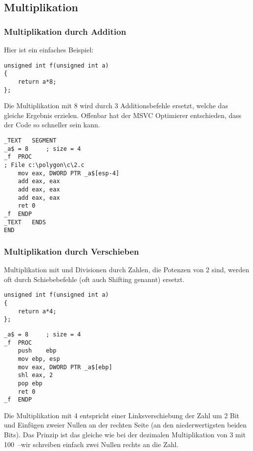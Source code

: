 \subsection{Multiplikation}

\subsubsection{Multiplikation durch Addition}

Hier ist ein einfaches Beispiel:

\begin{lstlisting}[caption=\Optimizing MSVC 2010]
unsigned int f(unsigned int a)
{
	return a*8;
};
\end{lstlisting}

Die Multiplikation mit 8 wird durch 3 Additionsbefehle ersetzt, welche das
gleiche Ergebnis erzielen. Offenbar hat der MSVC Optimierer entschieden, dass
der Code so schneller sein kann.

\begin{lstlisting}
_TEXT	SEGMENT
_a$ = 8		; size = 4
_f	PROC
; File c:\polygon\c\2.c
	mov	eax, DWORD PTR _a$[esp-4]
	add	eax, eax
	add	eax, eax
	add	eax, eax
	ret	0
_f	ENDP
_TEXT	ENDS
END
\end{lstlisting}

\subsubsection{Multiplikation durch Verschieben}
\label{subsec:mult_using_shifts}
Multiplikation mit und Divisionen durch Zahlen, die Potenzen von 2 sind, werden
oft durch Schiebebefehle (oft auch Shifting genannt) ersetzt.

\begin{lstlisting}
unsigned int f(unsigned int a)
{
	return a*4;
};
\end{lstlisting}

\begin{lstlisting}[caption=\NonOptimizing MSVC 2010]
_a$ = 8		; size = 4
_f	PROC
	push	ebp
	mov	ebp, esp
	mov	eax, DWORD PTR _a$[ebp]
	shl	eax, 2
	pop	ebp
	ret	0
_f	ENDP
\end{lstlisting}

Die Multiplikation mit 4 entspricht einer Linksverschiebung der Zahl um 2 Bit
und Einfügen zweier Nullen an der rechten Seite (an den niederwertigsten beiden
Bits). Das Prinzip ist das gleiche wie bei der dezimalen Multiplikation von 3
mit 100~--wir schreiben einfach zwei Nullen rechts an die Zahl.

